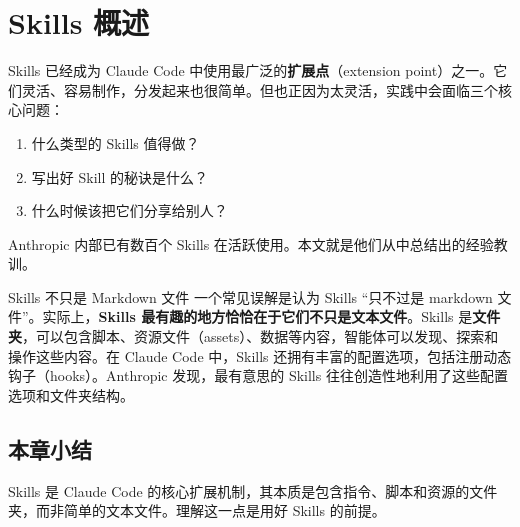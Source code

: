 \section{Skills 概述}

Skills 已经成为 Claude Code 中使用最广泛的\textbf{扩展点}（extension point）之一。它们灵活、容易制作，分发起来也很简单。但也正因为太灵活，实践中会面临三个核心问题：
\begin{enumerate}
    \item 什么类型的 Skills 值得做？
    \item 写出好 Skill 的秘诀是什么？
    \item 什么时候该把它们分享给别人？
\end{enumerate}

Anthropic 内部已有数百个 Skills 在活跃使用。本文就是他们从中总结出的经验教训。

\begin{importantbox}{Skills 不只是 Markdown 文件}
一个常见误解是认为 Skills ``只不过是 markdown 文件''。实际上，\textbf{Skills 最有趣的地方恰恰在于它们不只是文本文件}。Skills 是\textbf{文件夹}，可以包含脚本、资源文件（assets）、数据等内容，智能体可以发现、探索和操作这些内容。在 Claude Code 中，Skills 还拥有丰富的配置选项，包括注册动态钩子（hooks）。Anthropic 发现，最有意思的 Skills 往往创造性地利用了这些配置选项和文件夹结构。
\end{importantbox}

\subsection{本章小结}

Skills 是 Claude Code 的核心扩展机制，其本质是包含指令、脚本和资源的文件夹，而非简单的文本文件。理解这一点是用好 Skills 的前提。

